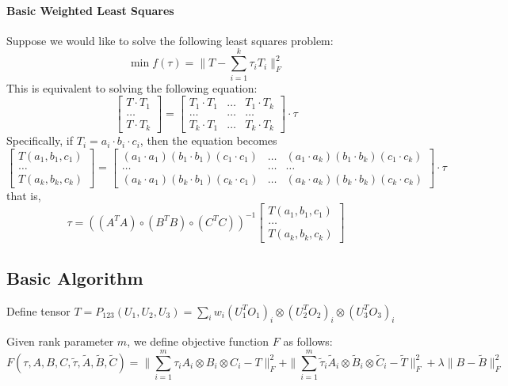 \documentclass{article}
\begin{document}
\paragraph{Basic Weighted Least Squares}
Suppose we would like to solve the following least squares problem:
\[ \min f(\tau) = \| T - \sum_{i=1}^k \tau_i T_i \|_F^2 \]
This is equivalent to solving the following equation:
\[
  \begin{bmatrix} T \cdot T_1 \\ \ldots \\ T \cdot T_k \end{bmatrix}
  =
  \begin{bmatrix} T_1 \cdot T_1 & \ldots & T_1 \cdot T_k \\ \ldots & \ldots & \ldots \\ T_k \cdot T_1 & \ldots & T_k \cdot T_k \end{bmatrix} \cdot \tau
\]
Specifically, if $T_i = a_i \cdot b_i \cdot c_i$, then the equation becomes
\[
  \begin{bmatrix} T(a_1, b_1, c_1) \\ \ldots \\ T(a_k, b_k, c_k) \end{bmatrix}
  =
  \begin{bmatrix} (a_1 \cdot a_1) (b_1 \cdot b_1) (c_1 \cdot c_1) & \ldots & (a_1 \cdot a_k) (b_1 \cdot b_k) (c_1 \cdot c_k) \\ \ldots & \ldots & \ldots \\ (a_k \cdot a_1) (b_k \cdot b_1) (c_k \cdot c_1) & \ldots & (a_k \cdot a_k) (b_k \cdot b_k) (c_k \cdot c_k) \end{bmatrix} \cdot \tau
\]
that is,
\[ \tau = ((A^T A) \circ (B^T B) \circ (C^T C))^{-1}  \begin{bmatrix} T(a_1, b_1, c_1) \\ \ldots \\ T(a_k, b_k, c_k) \end{bmatrix} \]


\subsection{Basic Algorithm}
Define tensor $T = P_{123}(U_1,U_2,U_3) = \sum_i w_i (U_1^TO_1)_i \otimes (U_2^TO_2)_i \otimes (U_3^TO_3)_i$

Given rank parameter $m$, we define objective function $F$ as follows:
\[ F(\tau, A, B, C, \tilde\tau, \tilde A, \tilde B, \tilde C) = \| \sum_{i=1}^m \tau_i A_i \otimes B_i \otimes C_i - T \|_F^2 + \| \sum_{i=1}^m \tilde\tau_i \tilde A_i \otimes \tilde B_i \otimes \tilde C_i - \tilde T \|_F^2 + \lambda \| B - \tilde B \|_F^2 \]
\end{document}
